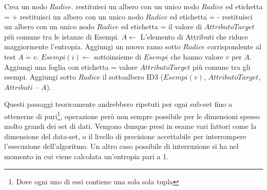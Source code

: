 \begin{algorithm}
	\begin{algorithmic}
			\State Crea un nodo $Radice$.
				\State restituisci un albero con un unico nodo $Radice$ ed etichetta = +
				\State restituisci un albero con un unico nodo $Radice$ ed etichetta = -
				\State restituisci un albero con un unico nodo $Radice$ ed etichetta = il valore di $AttributoTarget$ più comune tra le istanze di Esempi.
			\Else
				\State $A \leftarrow $ L'elemento di Attributi che riduce maggiormente l'entropia.
					\State Aggiungi un nuovo ramo sotto $Radice$ corrispondente al test $A = v$.
					\State $Esempi(i) \leftarrow$ sottoinsieme di $Esempi$ che hanno valore $v$ per $A$.
						Aggiungi una foglia con etichetta = valore $AttributoTarget$ più comune tra gli esempi.
					\Else
						\State Aggiungi sotto $Radice$ il sottoalbero ID3 ($Esempi(v)$, $AttributoTarget$, $Attributi$ – ${A}$).
					\EndIf
				\EndFor
			\EndIf
		\EndProcedure
	\end{algorithmic}
\end{algorithm}

Questi passaggi teoricamente andrebbero ripetuti per ogni sub-set fino a ottenerne di puri\footnote{Dove ogni uno di essi contiene una sola sola tupla}, operazione però non sempre possibile per le dimensioni spesso molto grandi dei set di dati. Vengono dunque presi in esame vari fattori come la dimensione del data-set, o il livello di precisione accettabile per interrompere l'esecuzione dell'algoritmo. Un altro caso possibile di interruzione si ha nel momento in cui viene calcolata un'entropia pari a 1.\\

